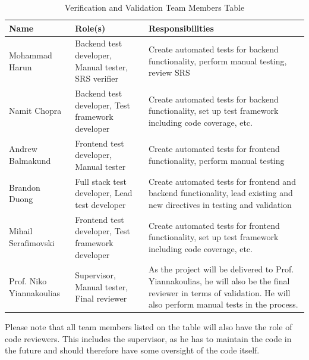 \documentclass[12pt, titlepage]{article}
\begin{document}
\begin{table}[H]
\caption{Verification and Validation Team Members Table}
\begin{adjustwidth}{-2cm}{-2cm}
\centering
\begin{tabular}{|l|p{1.8in}|p{2.5in}|}
\hline
\textbf{Name}            & \textbf{Role(s)}                                       & \textbf{Responsibilities}                                                                                                                                             \\ \hline
Mohammad Harun           & Backend test developer, Manual tester, SRS verifier               & Create automated tests for backend functionality, perform manual testing, review SRS                                                                                              \\ \hline
Namit Chopra             & Backend test developer, Test framework developer       & Create automated tests for backend functionality, set up test framework including code coverage, etc.                                                                 \\ \hline
Andrew Balmakund         & Frontend test developer, Manual tester                 & Create automated tests for frontend functionality, perform manual testing                                                                                             \\ \hline
Brandon Duong            & Full stack test developer, Lead test developer         & Create automated tests for frontend and backend functionality, lead existing and new directives in testing and validation                                             \\ \hline
Mihail Serafimovski      & Frontend test developer, Test framework developer      & Create automated tests for frontend functionality, set up test framework including code coverage, etc.                                                                \\ \hline
Prof. Niko Yiannakoulias & Supervisor, Manual tester, Final reviewer & As the project will be delivered to Prof. Yiannakoulias, he will also be the final reviewer in terms of validation. He will also perform manual tests in the process. \\ \hline
\end{tabular}
\end{adjustwidth}
\end{table}
Please note that all team members listed on the table will also have the role of code reviewers. This includes the supervisor, as he has to maintain the code in the future and should therefore have some oversight of the code itself.
\end{document}
